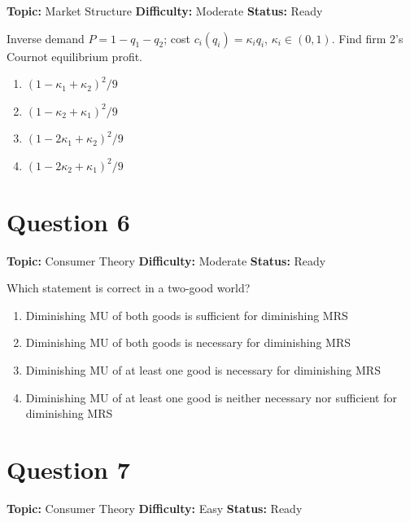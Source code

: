 \documentclass[11pt]{article}
\begin{document}

\noindent\textbf{Topic:} Market Structure \quad \textbf{Difficulty:} Moderate \quad \textbf{Status:} Ready



Inverse demand $P = 1 - q_1 - q_2$; cost $c_i(q_i) = \kappa_i q_i$, $\kappa_i \in (0,1)$.
Find firm 2's Cournot equilibrium profit.
\begin{enumerate}[label=(\Alph*)]
\item $(1 - \kappa_1 + \kappa_2)^2 / 9$
\item $(1 - \kappa_2 + \kappa_1)^2 / 9$  
\item $(1 - 2\kappa_1 + \kappa_2)^2 / 9$
\item $(1 - 2\kappa_2 + \kappa_1)^2 / 9$
\end{enumerate}

\newpage

\section*{Question 6}


\noindent\textbf{Topic:} Consumer Theory \quad \textbf{Difficulty:} Moderate \quad \textbf{Status:} Ready



Which statement is correct in a two-good world?
\begin{enumerate}[label=(\Alph*)]
\item Diminishing MU of both goods is sufficient for diminishing MRS
\item Diminishing MU of both goods is necessary for diminishing MRS
\item Diminishing MU of at least one good is necessary for diminishing MRS
\item Diminishing MU of at least one good is neither necessary nor sufficient for diminishing MRS
\end{enumerate}

\newpage

\section*{Question 7}


\noindent\textbf{Topic:} Consumer Theory \quad \textbf{Difficulty:} Easy \quad \textbf{Status:} Ready
\end{document}

